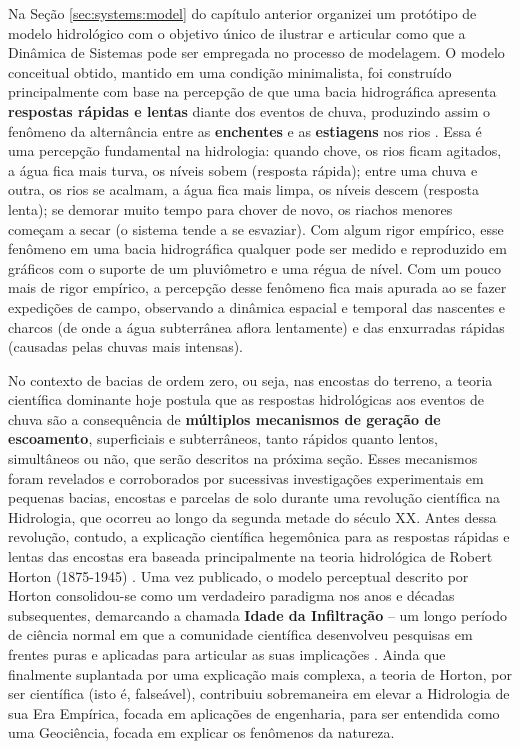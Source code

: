 \documentclass[./main.tex]{subfiles}
\begin{document}
\par Na Seção \ref{sec:systems:model} do capítulo anterior organizei um protótipo de modelo hidrológico com o objetivo único de ilustrar e articular como que a Dinâmica de Sistemas pode ser empregada no processo de modelagem. O modelo conceitual obtido, mantido em uma condição minimalista, foi construído principalmente com base na percepção de que uma bacia hidrográfica apresenta \textbf{respostas rápidas e lentas} diante dos eventos de chuva, produzindo assim o fenômeno da alternância entre as \textbf{enchentes} e as \textbf{estiagens} nos rios \cite{Hewlett1967}. Essa é uma percepção fundamental na hidrologia: quando chove, os rios ficam agitados, a água fica mais turva, os níveis sobem (resposta rápida); entre uma chuva e outra, os rios se acalmam, a água fica mais limpa, os níveis descem (resposta lenta); se demorar muito tempo para chover de novo, os riachos menores começam a secar (o sistema tende a se esvaziar). Com algum rigor empírico, esse fenômeno em uma bacia hidrográfica qualquer pode ser medido e reproduzido em gráficos com o suporte de um pluviômetro e uma régua de nível. Com um pouco mais de rigor empírico, a percepção desse fenômeno fica mais apurada ao se fazer expedições de campo, observando a dinâmica espacial e temporal das nascentes e charcos (de onde a água subterrânea aflora lentamente) e das enxurradas rápidas (causadas pelas chuvas mais intensas). 

\par No contexto de bacias de ordem zero, ou seja, nas encostas do terreno, a teoria científica dominante hoje postula que as respostas hidrológicas aos eventos de chuva são a consequência de \textbf{múltiplos mecanismos de geração de escoamento}, superficiais e subterrâneos, tanto rápidos quanto lentos, simultâneos ou não, que serão descritos na próxima seção. Esses mecanismos foram revelados e corroborados por sucessivas investigações experimentais em pequenas bacias, encostas e parcelas de solo durante uma revolução científica na Hidrologia, que ocorreu ao longo da segunda metade do século XX. Antes dessa revolução, contudo, a explicação científica hegemônica para as respostas rápidas e lentas das encostas era baseada principalmente na teoria hidrológica de Robert Horton (1875-1945) \cite{Horton1933, Beven2004a}. Uma vez publicado, o modelo perceptual descrito por Horton consolidou-se como um verdadeiro paradigma nos anos e décadas subsequentes, demarcando a chamada \textbf{Idade da Infiltração} -- um longo período de ciência normal em que a comunidade científica desenvolveu pesquisas em frentes puras e aplicadas para articular as suas implicações \cite{Cook1946, Beven2021b}. Ainda que finalmente suplantada por uma explicação mais complexa, a teoria de Horton, por ser científica (isto é, falseável), contribuiu sobremaneira em elevar a Hidrologia de sua Era Empírica, focada em aplicações de engenharia, para ser entendida como uma Geociência, focada em explicar os fenômenos da natureza.
\end{document}
